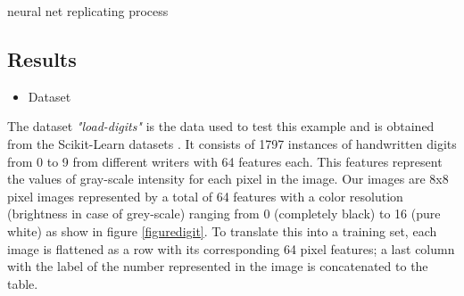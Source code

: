 \documentclass[a4paper,11pt,spanish]{report}
\makeatletter
\def\BState{\State\hskip-\ALG@thistlm}
\makeatother
\begin{document}
\vspace{25px}
\begin{algorithm}
\caption{neural net replicating process}
\label{alg1}
\end{algorithm}

\subsection{Results}
\label{ssec:res1}

\begin{itemize}
    \item Dataset
\end{itemize}
The dataset \textit{"load-digits"} is the data used to test this example and is obtained from the Scikit-Learn datasets \citep{scikit-learn}. It consists of 1797 instances of handwritten digits from 0 to 9 from different writers with 64 features each. This features represent the values of gray-scale intensity for each pixel in the image. Our images are 8x8 pixel images represented by  a total of 64 features with a color resolution (brightness in case of grey-scale) ranging from 0 (completely black) to 16 (pure white) as show in figure \ref{figuredigit}. To translate this into a training set, each image is flattened as a row with its corresponding 64 pixel features; a last column with the label of the number represented in the image is concatenated to the table.
\end{document}
